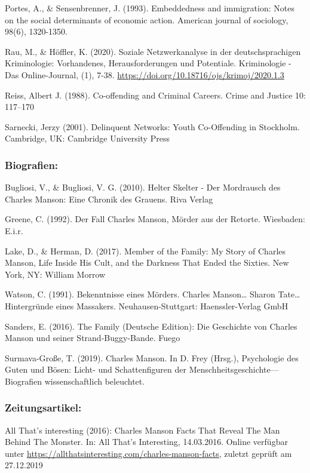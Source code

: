 \documentclass[
]{article}
\begin{document}
Portes, A., \& Sensenbrenner, J. (1993). Embeddedness and immigration:
Notes on the social determinants of economic action. American journal of
sociology, 98(6), 1320-1350.

Rau, M., \& Höffler, K. (2020). Soziale Netzwerkanalyse in der
deutschsprachigen Kriminologie: Vorhandenes, Herausforderungen und
Potentiale. Kriminologie - Das Online-Journal, (1), 7-38.
\url{https://doi.org/10.18716/ojs/krimoj/2020.1.3}

Reiss, Albert J. (1988). Co-offending and Criminal Careers. Crime and
Justice 10: 117--170

Sarnecki, Jerzy (2001). Delinquent Networks: Youth Co-Offending in
Stockholm. Cambridge, UK: Cambridge University Press

\hypertarget{biografien}{%
\subsubsection{Biografien:}\label{biografien}}

Bugliosi, V., \& Bugliosi, V. G. (2010). Helter Skelter - Der Mordrausch
des Charles Manson: Eine Chronik des Grauens. Riva Verlag

Greene, C. (1992). Der Fall Charles Manson, Mörder aus der Retorte.
Wiesbaden: E.i.r.

Lake, D., \& Herman, D. (2017). Member of the Family: My Story of
Charles Manson, Life Inside His Cult, and the Darkness That Ended the
Sixties. New York, NY: William Morrow

Watson, C. (1991). Bekenntnisse eines Mörders. Charles Manson\ldots{}
Sharon Tate\ldots Hintergründe eines Massakers. Neuhausen-Stuttgart:
Haenssler-Verlag GmbH

Sanders, E. (2016). The Family (Deutsche Edition): Die Geschichte von
Charles Manson und seiner Strand-Buggy-Bande. Fuego

Surmava-Große, T. (2019). Charles Manson. In D. Frey (Hrsg.),
Psychologie des Guten und Bösen: Licht- und Schattenfiguren der
Menschheitsgeschichte---Biografien wissenschaftlich beleuchtet.

\hypertarget{zeitungsartikel}{%
\subsubsection{Zeitungsartikel:}\label{zeitungsartikel}}

All That's interesting (2016): Charles Manson Facts That Reveal The Man
Behind The Monster. In: All That's Interesting, 14.03.2016. Online
verfügbar unter
\url{https://allthatsinteresting.com/charles-manson-facts}, zuletzt
geprüft am 27.12.2019
\end{document}
